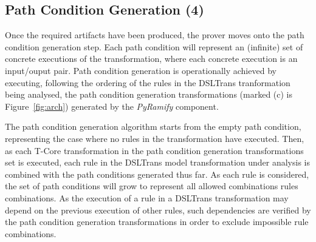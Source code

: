 % 

\subsection{Path Condition Generation (4)}
\label{sec:path_cond_gen}

Once the required artifacts have been produced, the prover moves onto the path
condition generation step. Each path condition will represent an (infinite) set
of concrete executions of the transformation, where each concrete execution is an
input/ouput pair. Path condition generation is operationally achieved by
executing, following the ordering of the rules in the DSLTrans
tranformation being analysed, the path condition generation transformations
(marked (c) is Figure~\ref{fig:arch}) generated by the \emph{PyRamify}
component.

The path condition generation algorithm starts from the empty path condition,
representing the case where no rules in the transformation have executed. Then,
as each T-Core transformation in the path condition generation transformations
set is executed, each rule in the DSLTrans model transformation under analysis
is combined with the path conditions generated thus far. As each rule is
considered, the set of path conditions will grow to represent all allowed
combinations rules combinations. As the execution of a rule in a DSLTrans
transformation may depend on the previous execution of other rules, such
dependencies are verified by the path condition generation
transformations in order to exclude impossible rule combinations.


